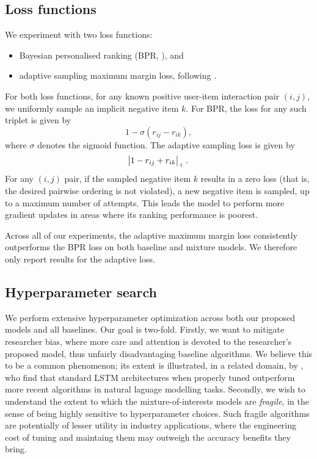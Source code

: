 \documentclass[sigconf]{acmart}
\begin{document}
\subsection{Loss functions}
We experiment with two loss functions:
\begin{itemize}
\item Bayesian personalised ranking (BPR, \citet{rendle2009bpr}), and
\item adaptive sampling maximum margin loss, following \citet{weston2011wsabie}.
\end{itemize}
For both loss functions, for any known positive user-item interaction pair $(i, j)$, we uniformly sample an implicit negative item $k$. For BPR, the loss for any such triplet is given by
\begin{equation}
1 - \sigma\left(r_{ij} - r_{ik}\right),
\end{equation}
where $\sigma$ denotes the sigmoid function.
The adaptive sampling loss is given by
\begin{equation}
\abs{1 - r_{ij} + r_{ik}}_{+}.
\end{equation}
For any $(i, j)$ pair, if the sampled negative item $k$ results in a zero loss (that is, the desired pairwise ordering is not violated), a new negative item is sampled, up to a maximum number of attempts. This leads the model to perform more gradient updates in areas where its ranking performance is poorest.

Across all of our experiments, the adaptive maximum margin loss consistently outperforms the BPR loss on both baseline and mixture models. We therefore only report results for the adaptive loss.

\subsection{Hyperparameter search}

We perform extensive hyperparameter optimization across both our proposed models and all baselines. Our goal is two-fold. Firstly, we want to mitigate researcher bias, where more care and attention is devoted to the researcher's proposed model, thus unfairly disadvantaging baseline algorithms. We believe this to be a common phenomenon; its extent is illustrated, in a related domain, by \cite{melis2017state}, who find that standard LSTM architectures when properly tuned outperform more recent algorithms in natural laguage modelling tasks. Secondly, we wish to understand the extent to which the mixture-of-interests models are \emph{fragile}, in the sense of being highly sensitive to hyperparameter choices. Such fragile algorithms are potentially of lesser utility in industry applications, where the engineering cost of tuning and maintaing them may outweigh the accuracy benefits they bring.
\end{document}
